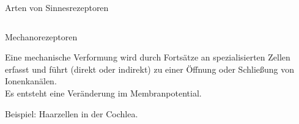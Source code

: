 \documentclass[aspectratio=169]{beamer}
\begin{document}
\begin{frame}{Arten von Sinnesrezeptoren}

\begin{columns}[c]

\begin{column}{7cm}

\begin{block}{Mechanorezeptoren}

Eine mechanische Verformung wird durch Fortsätze an spezialisierten Zellen erfasst und führt (direkt oder indirekt) zu einer Öffnung oder Schließung von Ionenkanälen.  \\

Es entsteht eine Veränderung im Membranpotential.



Beispiel: Haarzellen in der Cochlea.

\end{block}
\end{column}


\end{columns}
\end{frame}
\end{document}
